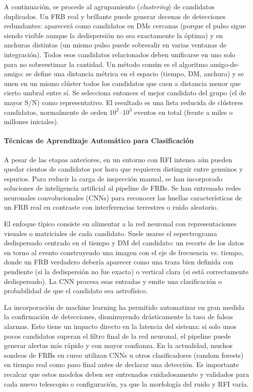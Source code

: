 A continuación, se procede al agrupamiento (\textit{clustering}) de candidatos duplicados. Un FRB real y brillante puede generar decenas de detecciones redundantes: aparecerá como candidatos en DMs cercanas (porque el pulso sigue siendo visible aunque la dedispersión no sea exactamente la óptima) y en anchuras distintas (un mismo pulso puede sobresalir en varias ventanas de integración). Todos esos candidatos relacionados deben unificarse en uno solo para no sobreestimar la cantidad. Un método común es el algoritmo amigo-de-amigo: se define una distancia métrica en el espacio (tiempo, DM, anchura) y se unen en un mismo clúster todos los candidatos que caen a distancia menor que cierto umbral entre sí. Se selecciona entonces el mejor candidato del grupo (el de mayor S/N) como representativo. El resultado es una lista reducida de clústeres candidatos, normalmente de orden $10^2$--$10^3$ eventos en total (frente a miles o millones iniciales).

\paragraph{Técnicas de Aprendizaje Automático para Clasificación}

A pesar de las etapas anteriores, en un entorno con RFI intensa aún pueden quedar cientos de candidatos por hora que requieren distinguir entre genuinos y espurios. Para reducir la carga de inspección manual, se han incorporado soluciones de inteligencia artificial al pipeline de FRBs. Se han entrenado redes neuronales convolucionales (CNNs) para reconocer las huellas características de un FRB real en contraste con interferencias terrestres o ruido aleatorio.

El enfoque típico consiste en alimentar a la red neuronal con representaciones visuales o matriciales de cada candidato. Suele usarse el espectrograma dedispersado centrado en el tiempo y DM del candidato: un recorte de los datos en torno al evento construyendo una imagen con el eje de frecuencia vs. tiempo, donde un FRB verdadero debería aparecer como una traza bien definida con pendiente (si la dedispersión no fue exacta) o vertical clara (si está correctamente dedispersado). La CNN procesa esas entradas y emite una clasificación o probabilidad de que el candidato sea astrofísico.

La incorporación de machine learning ha permitido automatizar en gran medida la confirmación de detecciones, disminuyendo drásticamente la tasa de falsas alarmas. Esto tiene un impacto directo en la latencia del sistema: si solo unos pocos candidatos superan el filtro final de la red neuronal, el pipeline puede generar alertas más rápido y con mayor confianza. En la actualidad, muchos sondeos de FRBs en curso utilizan CNNs u otros clasificadores (random forests) en tiempo real como paso final antes de declarar una detección. Es importante recalcar que estos modelos deben ser entrenados cuidadosamente y validados para cada nuevo telescopio o configuración, ya que la morfología del ruido y RFI varía.

